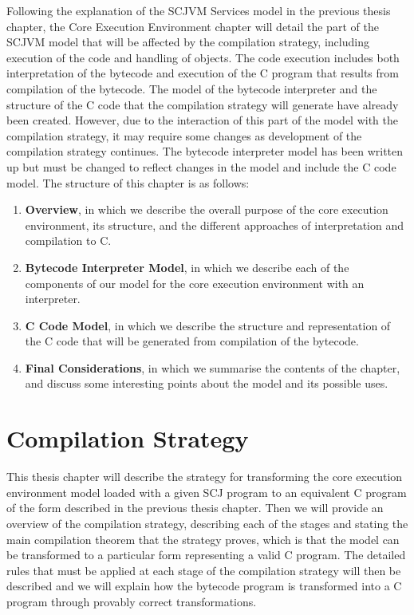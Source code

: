 \documentclass[a4paper,10pt]{report}
\let\olditem\item
\renewcommand{\item}[1][]{\olditem{\bfseries #1}}
\begin{document}
Following the explanation of the SCJVM Services model in the previous
thesis chapter, the Core Execution Environment chapter will detail the
part of the SCJVM model that will be affected by the compilation
strategy, including execution of the code and handling of objects.
The code execution includes both interpretation of the bytecode and
execution of the C program that results from compilation of the
bytecode.
The model of the bytecode interpreter and the structure of the C code
that the compilation strategy will generate have already been created.
However, due to the interaction of this part of the model with the
compilation strategy, it may require some changes as development of
the compilation strategy continues.
The bytecode interpreter model has been written up but must be changed
to reflect changes in the model and include the C code model.
The structure of this chapter is as follows:
\begin{enumerate}
\item[Overview], in which we describe the overall purpose of the core
  execution environment, its structure, and the different approaches
  of interpretation and compilation to C.
\item[Bytecode Interpreter Model], in which we describe each of the
  components of our model for the core execution environment with an
  interpreter.
\item[C Code Model], in which we describe the structure and
  representation of the C code that will be generated from compilation
  of the bytecode.
\item[Final Considerations], in which we summarise the contents of the
  chapter, and discuss some interesting points about the model and its
  possible uses.
\end{enumerate}

\section{Compilation Strategy}

This thesis chapter will describe the strategy for transforming the
core execution environment model loaded with a given SCJ program to an
equivalent C program of the form described in the previous thesis
chapter.
Then we will provide an overview of the compilation strategy,
describing each of the stages and stating the main compilation theorem
that the strategy proves, which is that the model can be transformed
to a particular form representing a valid C program.
The detailed rules that must be applied at each stage of the
compilation strategy will then be described and we will explain how
the bytecode program is transformed into a C program through provably
correct transformations.
\end{document}
